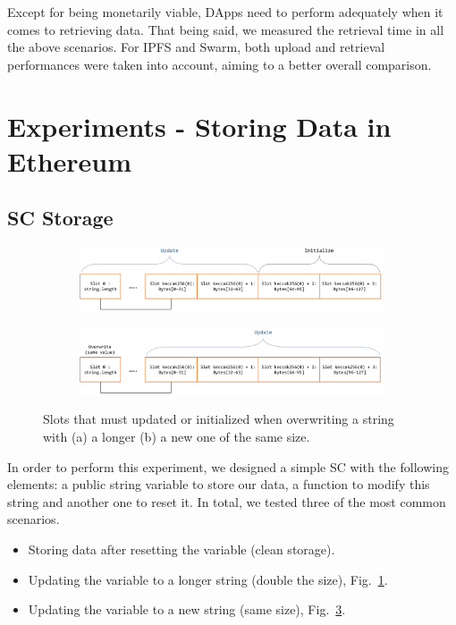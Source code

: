 Except for being monetarily viable, DApps need to perform adequately when it comes to retrieving data. That being said, we measured the retrieval time in all the above scenarios. For IPFS and Swarm, both upload and retrieval performances were taken into account, aiming to a better overall comparison.
\section{Experiments - Storing Data in Ethereum}\label{sec:}
\subsection{SC Storage}\label{subsection:}
\begin{figure}[htbp]
    \begin{subfigure}{\linewidth}
        \centerline{\includegraphics[width=9cm]{figs/Storage1.pdf}}
        \caption{}
        \label{fig:arrays_1}
    \end{subfigure}
    \begin{subfigure}{\linewidth}
        \centerline{\includegraphics[width=9cm]{figs/Storage2.pdf}}
        \caption{}
        \label{fig:arrays_2}
    \end{subfigure}
    \caption{Slots that must updated or initialized when overwriting a string with (a) a longer (b) a new one of the same size.}
\end{figure}

In order to perform this experiment, we designed a simple SC with the following elements: a public string variable to store our data, a function to modify this string and another one to reset it. In total, we tested three of the most common scenarios.

\begin{itemize}[topsep=0pt, itemsep=0pt]
  \item Storing data after resetting the variable (clean storage).
  \item Updating the variable to a longer string (double the size), Fig.~\ref{fig:arrays_1}.
  \item Updating the variable to a new string (same size), Fig.~\ref{fig:arrays_2}.
\end{itemize}

